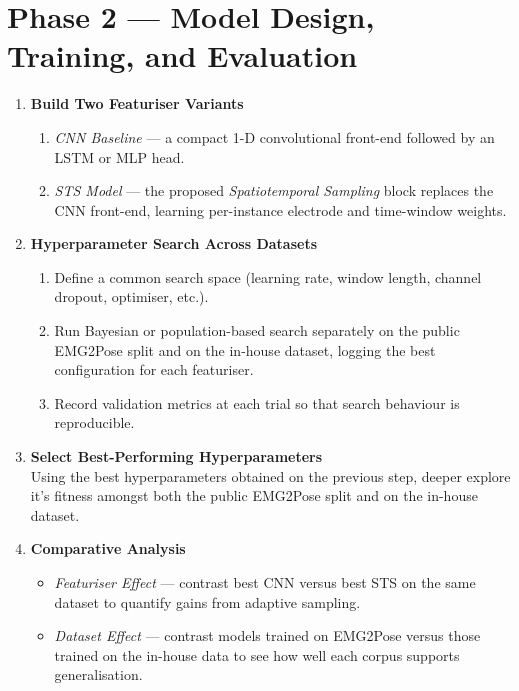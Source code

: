 \section{Phase 2 — Model Design, Training, and Evaluation}

\begin{enumerate}[label=\textbf{2.\arabic*.}, wide=0pt, leftmargin=*]

    \item \textbf{Build Two Featuriser Variants}\\
          \begin{enumerate}[label*=\arabic*.]
              \item \emph{CNN Baseline} — a compact 1-D convolutional front-end followed by an LSTM or MLP head.  
              \item \emph{STS Model} — the proposed \textit{Spatiotemporal Sampling} block replaces the CNN front-end, learning per-instance electrode and time-window weights.  
          \end{enumerate}

    \item \textbf{Hyperparameter Search Across Datasets}\\
          \begin{enumerate}[label*=\arabic*.]
              \item Define a common search space (learning rate, window length, channel dropout, optimiser, etc.).  
              \item Run Bayesian or population-based search separately on the public EMG2Pose split and on the in-house dataset, logging the best configuration for each featuriser.  
              \item Record validation metrics at each trial so that search behaviour is reproducible.
          \end{enumerate}

    \item \textbf{Select Best-Performing Hyperparameters}\\
          Using the best hyperparameters obtained on the previous step, deeper explore it's fitness amongst both the public EMG2Pose split and on the in-house dataset.

    \item \textbf{Comparative Analysis}\\
          \begin{itemize}
              \item \textit{Featuriser Effect} — contrast best CNN versus best STS on the same dataset to quantify gains from adaptive sampling.  
              \item \textit{Dataset Effect} — contrast models trained on EMG2Pose versus those trained on the in-house data to see how well each corpus supports generalisation.  
          \end{itemize}

\end{enumerate}